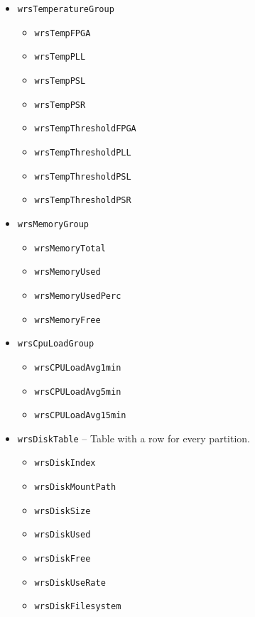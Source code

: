 \begin{itemize}
\begin{itemize}
      \item \texttt{wrsTemperatureGroup}
	\begin{itemize}
	  \item \texttt{wrsTempFPGA}
	  \item \texttt{wrsTempPLL}
	  \item \texttt{wrsTempPSL}
	  \item \texttt{wrsTempPSR}
	  \item \texttt{wrsTempThresholdFPGA}
	  \item \texttt{wrsTempThresholdPLL}
	  \item \texttt{wrsTempThresholdPSL}
	  \item \texttt{wrsTempThresholdPSR}
	\end{itemize}
      \item \texttt{wrsMemoryGroup}
	\begin{itemize}
	  \item \texttt{wrsMemoryTotal}
	  \item \texttt{wrsMemoryUsed}
	  \item \texttt{wrsMemoryUsedPerc}
	  \item \texttt{wrsMemoryFree}
	\end{itemize}
      \item \texttt{wrsCpuLoadGroup}
	\begin{itemize}
	  \item \texttt{wrsCPULoadAvg1min}
	  \item \texttt{wrsCPULoadAvg5min}
	  \item \texttt{wrsCPULoadAvg15min}
	\end{itemize}
      \item \texttt{wrsDiskTable} -- Table with a row for every partition.
	\begin{itemize}
	  \item \texttt{wrsDiskIndex}
	  \item \texttt{wrsDiskMountPath}
	  \item \texttt{wrsDiskSize}
	  \item \texttt{wrsDiskUsed}
	  \item \texttt{wrsDiskFree}
	  \item \texttt{wrsDiskUseRate}
	  \item \texttt{wrsDiskFilesystem}
	\end{itemize}
    \end{itemize}


\end{itemize}
